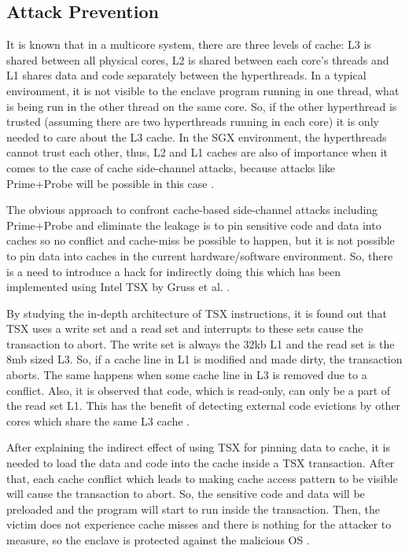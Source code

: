 \subsection{Attack Prevention}%
It is known that in a multicore system, there are three levels of cache: L3 is shared between all physical cores, L2 is shared between each core's threads and L1 shares data and code separately between the hyperthreads. In a typical environment, it is not visible to the enclave program running in one thread, what is being run in the other thread on the same core. So, if the other hyperthread is trusted (assuming there are two hyperthreads running in each core) it is only needed to care about the L3 cache. In the SGX environment, the hyperthreads cannot trust each other, thus, L2 and L1 caches are also of importance when it comes to the case of cache side-channel attacks, because attacks like Prime+Probe will be possible in this case \cite{cloak}.

The obvious approach to confront cache-based side-channel attacks including Prime+Probe and eliminate the leakage is to pin sensitive code and data into caches so no conflict and cache-miss be possible to happen, but it is not possible to pin data into caches in the current hardware/software environment. So, there is a need to introduce a hack for indirectly doing this which has been implemented using Intel TSX by Gruss et al. \cite{cloak}.

By studying the in-depth architecture of TSX instructions, it is found out that TSX uses a write set and a read set and interrupts to these sets cause the transaction to abort. The write set is always the 32kb L1 and the read set is the 8mb sized L3. So, if a cache line in L1 is modified and made dirty, the transaction aborts. The same happens when some cache line in L3 is removed due to a conflict. Also, it is observed that code, which is read-only, can only be a part of the read set L1. This has the benefit of detecting external code evictions by other cores which share the same L3 cache \cite{cloak}.

After explaining the indirect effect of using TSX for pinning data to cache, it is needed to load the data and code into the cache inside a TSX transaction. After that, each cache conflict which leads to making cache access pattern to be visible will cause the transaction to abort. So, the sensitive code and data will be preloaded and the program will start to run inside the transaction. Then, the victim does not experience cache misses and there is nothing for the attacker to measure, so the enclave is protected against the malicious OS \cite{cloak}.


